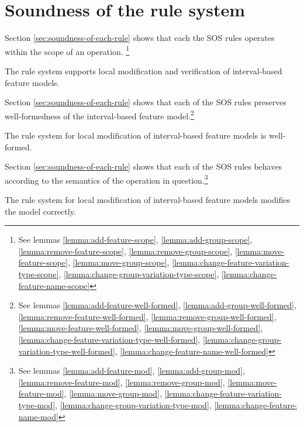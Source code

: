 \section{Soundness of the rule system}
Section \vref{sec:soundness-of-each-rule} shows that each the SOS rules operates within the scope of an operation. \footnote{See lemmas \vref{lemma:add-feature-scope}, \vref{lemma:add-group-scope}, \vref{lemma:remove-feature-scope}, \vref{lemma:remove-group-scope}, \vref{lemma:move-feature-scope}, \vref{lemma:move-group-scope}, \vref{lemma:change-feature-variation-type-scope}, \vref{lemma:change-group-variation-type-scope}, \vref{lemma:change-feature-name-scope}}
\\
\begin{theorem}
  The rule system supports local modification and verification of interval-based feature models.
\end{theorem}

Section \vref{sec:soundness-of-each-rule} shows that each of the SOS rules preserves well-formedness of the interval-based feature model.\footnote{See lemmas \vref{lemma:add-feature-well-formed}, \vref{lemma:add-group-well-formed}, \vref{lemma:remove-feature-well-formed}, \vref{lemma:remove-group-well-formed}, \vref{lemma:move-feature-well-formed}, \vref{lemma:move-group-well-formed}, \vref{lemma:change-feature-variation-type-well-formed}, \vref{lemma:change-group-variation-type-well-formed}, \vref{lemma:change-feature-name-well-formed}}
\\
\begin{theorem}
  The rule system for local modification of interval-based feature models is well-formed.
\end{theorem}

Section \vref{sec:soundness-of-each-rule} shows that each of the SOS rules behaves according to the semantics of the operation in question.\footnote{See lemmas \vref{lemma:add-feature-mod}, \vref{lemma:add-group-mod}, \vref{lemma:remove-feature-mod}, \vref{lemma:remove-group-mod}, \vref{lemma:move-feature-mod}, \vref{lemma:move-group-mod}, \vref{lemma:change-feature-variation-type-mod}, \vref{lemma:change-group-variation-type-mod}, \vref{lemma:change-feature-name-mod}}
\\
\begin{theorem}
  The rule system for local modification of interval-based feature models modifies the model correctly.
\end{theorem}
